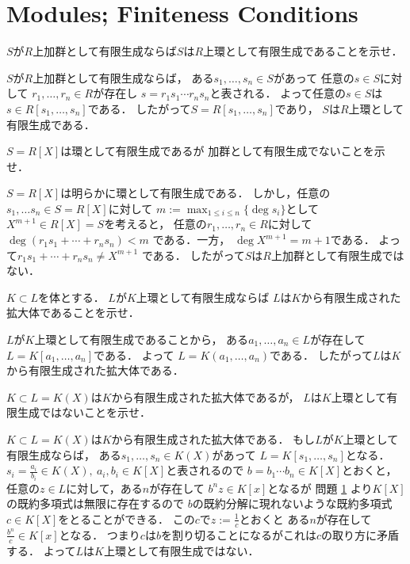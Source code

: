 \section{Modules; Finiteness Conditions}

\begin{prob}
  $S$が$R$上加群として有限生成ならば$S$は$R$上環として有限生成であることを示せ．
\end{prob}
\begin{ans}
  $S$が$R$上加群として有限生成ならば，
  ある$s_1, \dots , s_n \in S$があって
  任意の$s\in S$に対して
  $r_1, \dots, r_n \in R$が存在し
  $s = r_1 s_1 \cdots r_n s_n $と表される．
  よって任意の$s \in S$は
  $s \in R[s_1, \dots, s_n ]$である．
  したがって$S = R[s_1, \dots, s_n ]$であり，
  $S$は$R$上環として有限生成である．
\end{ans}

\begin{prob}
  $S = R[X]$は環として有限生成であるが
  加群として有限生成でないことを示せ．
\end{prob}
\begin{ans}
  $S = R[X]$は明らかに環として有限生成である．
  しかし，任意の$s_1, \dots s_n \in S = R[X]$に対して
  $ m := \max_{1 \le i \le n} \{ \deg s_i \} $として
  $X^{m+1} \in R[X] = S $を考えると，
  任意の$r_1, \dots , r_n \in R$に対して
  $ \deg ( r_1 s_1 + \cdots + r_n s_n ) < m $
  である．一方，
  $ \deg X^{m+1} = m + 1 $である．
  よって$ r_1 s_1 + \cdots + r_n s_n \ne X^{m+1} $
  である．
  したがって$S$は$R$上加群として有限生成ではない．
\end{ans}

\begin{prob}
  $K \subset L$を体とする．
  $L$が$K$上環として有限生成ならば
  $L$は$K$から有限生成された拡大体であることを示せ．
\end{prob}
\begin{ans}
  $L$が$K$上環として有限生成であることから，
  ある$a_1, \dots , a_n \in L$が存在して
  $ L = K[a_1, \dots, a_n] $である．
  よって
  $ L = K( a_1, \dots , a_n ) $である．
  したがって$L$は$K$から有限生成された拡大体である．
\end{ans}

\begin{prob}
  $K \subset L = K(X)$は$K$から有限生成された拡大体であるが，
  $L$は$K$上環として有限生成ではないことを示せ．
\end{prob}
\begin{ans}
  $K \subset L = K(X)$は$K$から有限生成された拡大体である．
  もし$L$が$K$上環として有限生成ならば，
  ある$ s_1, \dots, s_n \in K(X)$があって
  $L = K[s_1, \dots, s_n]$となる．
  $ s_i = \frac{a_i}{b_i} \in K(X), \ a_i, b_i \in K[X]$と表されるので
  $b = b_1 \cdots b_n \in K[X]$とおくと，
  任意の$z \in L$に対して，ある$n$が存在して
  $ b^n z \in K[x]$となるが
  問題 \ref{} より$K[X]$の既約多項式は無限に存在するので
  $b$の既約分解に現れないような既約多項式$c \in K[X]$をとることができる．
  この$c$で$z := \frac{1}{c}$とおくと
  ある$n$が存在して$ \frac{b^n}{c} \in K[x] $となる．
  つまり$c$は$b$を割り切ることになるがこれは$c$の取り方に矛盾する．
  よって$L$は$K$上環として有限生成ではない．
\end{ans}

